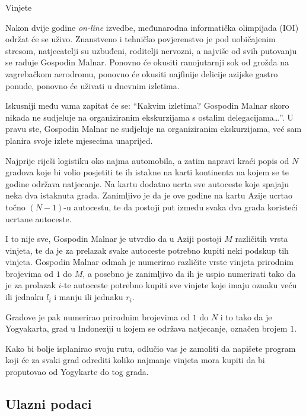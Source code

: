 \begin{statement}[
  problempoints=100,
  timelimit=3 sekunde,
  memorylimit=512 MiB,
]{Vinjete}

Nakon dvije godine \textit{on-line} izvedbe, međunarodna informatička
olimpijada (IOI) održat će se uživo. Znanstveno i tehničko povjerenstvo je
pod uobičajenim stresom, natjecatelji su uzbuđeni, roditelji nervozni, a
najviše od svih putovanju se raduje Gospodin Malnar. Ponovno će okusiti
ranojutarnji sok od grožđa na zagrebačkom aerodromu, ponovno će okusiti
najfinije delicije azijske gastro ponude, ponovno će uživati u dnevnim
izletima.

Iskusniji među vama zapitat će se: ``Kakvim izletima? Gospodin Malnar skoro
nikada ne sudjeluje na organiziranim ekskurzijama s ostalim delegacijama\ldots''.
U pravu ste, Gospodin Malnar ne sudjeluje na organiziranim ekskurzijama, već sam
planira svoje izlete mjesecima unaprijed.

Najprije riješi logistiku oko najma automobila, a zatim napravi kraći popis od
$N$ gradova koje bi volio posjetiti te ih istakne na karti kontinenta na
kojem se te godine održava natjecanje. Na kartu dodatno ucrta sve autoceste
koje spajaju neka dva istaknuta grada. Zanimljivo je da je ove godine na
kartu Azije ucrtao točno $(N-1)$-u autocestu, te da postoji put između svaka
dva grada koristeći ucrtane autoceste.

I to nije sve, Gospodin Malnar je utvrdio da u Aziji postoji $M$ različitih
vrsta vinjeta, te da je za prelazak svake autoceste potrebno kupiti neki
podskup tih vinjeta. Gospodin Malnar odmah je numerirao različite vrste
vinjeta prirodnim brojevima od $1$ do $M$, a posebno je zanimljivo da ih je
uspio numerirati tako da je za prolazak $i$-te autoceste potrebno kupiti sve
vinjete koje imaju oznaku veću ili jednaku $l_i$ i manju ili jednaku $r_i$.

Gradove je pak numerirao prirodnim brojevima od $1$ do $N$ i to tako da je
Yogyakarta, grad u Indoneziji u kojem se održava natjecanje, označen brojem $1$.

Kako bi bolje isplanirao svoju rutu, odlučio vas je zamoliti da napišete program
koji će za svaki grad odrediti koliko najmanje vinjeta mora kupiti da bi
proputovao od Yogykarte do tog grada.
\subsection*{Ulazni podaci}


\end{statement}
